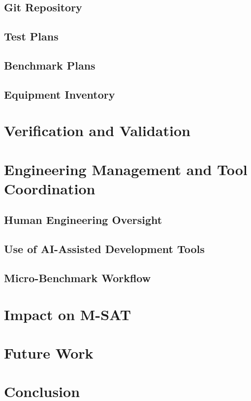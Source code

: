 \documentclass[11pt]{article}
\begin{document}
\subsection{Git Repository}

\subsection{Test Plans}

\subsection{Benchmark Plans}

\subsection{Equipment Inventory}

\section{Verification and Validation}

\section{Engineering Management and Tool Coordination}

\subsection{Human Engineering Oversight}

\subsection{Use of AI-Assisted Development Tools}

\subsection{Micro-Benchmark Workflow}

\section{Impact on M-SAT}

\section{Future Work}

\section{Conclusion}
\end{document}
